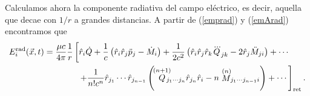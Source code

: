 Calculamos ahora la componente radiativa del campo eléctrico, es decir, aquella que decae con $1/r$ a grandes distancias. A partir de (\ref{emprad}) y (\ref{emArad}) encontramos que
\begin{align}
E_i^{\rm rad}(\vec{x},t) &= \frac{\mu c}{4\pi}\frac{1}{r}\left[\hat{r}_i\dot{Q}+\frac{1}{c}\left(\hat{r}_i\hat{r}_j\ddot{p}_j-\dot{M}_i\right)+\frac{1}{2c^2}\left(\hat{r}_i\hat{r}_j\hat{r}_k\dddot{Q}_{jk} -2\hat{r}_j\ddot{M}_{ji}\right)+\cdots\right.\nonumber\\
& \qquad\qquad \left.+\frac{1}{n!c^n}\hat{r}_{j_1}\cdots\hat{r}_{j_{n-1}}\left(\!\stackrel{(n+1)}{Q}\!\!\!\!\!{}_{j_1\cdots j_n}\hat{r}_{j_n}\hat{r}_i- n\stackrel{(n)}{M}\!\!{}_{j_1\cdots j_{n-1}i}\right)+\cdots\right]_{\rm ret}. \label{emErad}
\end{align}

